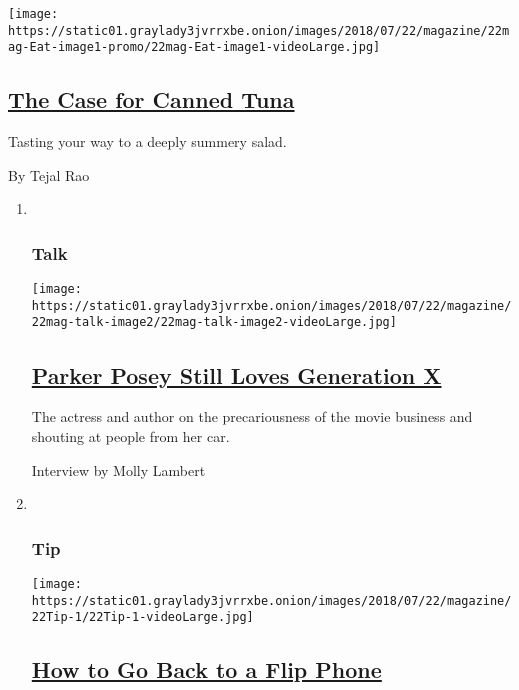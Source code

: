 \begin{enumerate}
  \texttt{[image: https://static01.graylady3jvrrxbe.onion/images/2018/07/22/magazine/22mag-Eat-image1-promo/22mag-Eat-image1-videoLarge.jpg]}

  \hypertarget{the-case-for-canned-tuna}{%
  \subsection{\texorpdfstring{\href{/2018/07/17/magazine/the-case-for-canned-tuna.html}{The
  Case for Canned
  Tuna}}{The Case for Canned Tuna}}\label{the-case-for-canned-tuna}}

  Tasting your way to a deeply summery salad.

  By Tejal Rao
\end{enumerate}

\begin{enumerate}
\def\labelenumi{\arabic{enumi}.}
\item ~
  \hypertarget{talk}{%
  \subsubsection{Talk}\label{talk}}

  \texttt{[image: https://static01.graylady3jvrrxbe.onion/images/2018/07/22/magazine/22mag-talk-image2/22mag-talk-image2-videoLarge.jpg]}

  \hypertarget{parker-posey-still-loves-generation-x}{%
  \subsection{\texorpdfstring{\href{/2018/07/17/magazine/parker-posey-still-loves-generation-x.html}{Parker
  Posey Still Loves Generation
  X}}{Parker Posey Still Loves Generation X}}\label{parker-posey-still-loves-generation-x}}

  The actress and author on the precariousness of the movie business and
  shouting at people from her car.

  Interview by Molly Lambert
\item ~
  \hypertarget{tip}{%
  \subsubsection{Tip}\label{tip}}

  \texttt{[image: https://static01.graylady3jvrrxbe.onion/images/2018/07/22/magazine/22Tip-1/22Tip-1-videoLarge.jpg]}

  \hypertarget{how-to-go-back-to-a-flip-phone}{%
  \subsection{\texorpdfstring{\href{/2018/07/19/magazine/how-to-go-back-to-a-flip-phone.html}{How
  to Go Back to a Flip
  Phone}}{How to Go Back to a Flip Phone}}\label{how-to-go-back-to-a-flip-phone}}


\end{enumerate}
